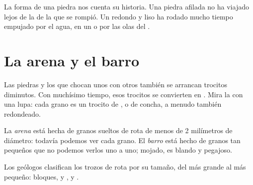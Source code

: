 \begin{remark}\label{rem:g3:stones-pebbles-sand:shape}
La forma de una piedra nos cuenta su historia. Una piedra afilada no ha
viajado lejos de la  de la que se rompió. Un  redondo y liso ha
rodado mucho tiempo empujado por el agua, en un  o por las olas del .
\end{remark}

\section{La arena y el barro}

Las piedras y los  que chocan unos con otros también se arrancan
trocitos diminutos. Con muchísimo tiempo, esos trocitos se convierten en
. Mira la  con una lupa: cada grano es un trocito de , o de
concha, a menudo también redondeado.

\begin{definition}\label{def:g3:stones-pebbles-sand:sand}
La \emph{arena} está hecha de granos sueltos de  rota de
menos de 2 milímetros de diámetro: todavía podemos ver cada grano. El
\emph{barro} está hecho de granos tan pequeños que no podemos
verlos uno a uno; mojado, es blando y pegajoso.
\end{definition}

Los geólogos clasifican los trozos de  rota por su tamaño, del más
grande al más pequeño: bloques,  y ,  y .

